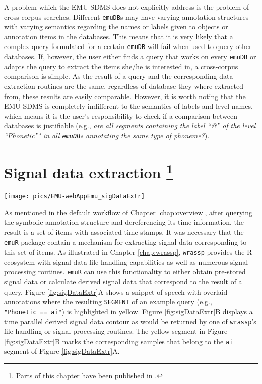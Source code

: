 \documentclass[
]{book}
\begin{document}
A problem which the EMU-SDMS does not explicitly address is the problem of cross-corpus searches. Different \texttt{emuDB}s may have varying annotation structures with varying semantics regarding the names or labels given to objects or annotation items in the databases. This means that it is very likely that a complex query formulated for a certain \texttt{emuDB} will fail when used to query other databases. If, however, the user either finds a query that works on every \texttt{emuDB} or adapts the query to extract the items she/he is interested in, a cross-corpus comparison is simple. As the result of a query and the corresponding data extraction routines are the same, regardless of database they where extracted from, these results are easily comparable. However, it is worth noting that the EMU-SDMS is completely indifferent to the semantics of labels and level names, which means it is the user's responsibility to check if a comparison between databases is justifiable (e.g., \emph{are all segments containing the label ``@'' of the level ``Phonetic''" in all \texttt{emuDB}s annotating the same type of phoneme?}).

\hypertarget{chap:sigDataExtr}{%
\chapter[Signal data extraction ]{\texorpdfstring{Signal data extraction \footnote{Parts of this chapter have been published in \citet{winkelmann:2017aa}.}}{Signal data extraction }}\label{chap:sigDataExtr}}

\begin{center}\texttt{[image: pics/EMU-webAppEmu\_sigDataExtr]} \end{center}

As mentioned in the default workflow of Chapter \ref{chap:overview}, after querying the symbolic annotation structure and dereferencing its time information, the result is a set of items with associated time stamps. It was necessary that the \texttt{emuR} package contain a mechanism for extracting signal data corresponding to this set of items. As illustrated in Chapter \ref{chap:wrassp}, \texttt{wrassp} provides the R ecosystem with signal data file handling capabilities as well as numerous signal processing routines. \texttt{emuR} can use this functionality to either obtain pre-stored signal data or calculate derived signal data that correspond to the result of a query. Figure \ref{fig:sigDataExtr}A shows a snippet of speech with overlaid annotations where the resulting \texttt{SEGMENT} of an example query (e.g., \texttt{"Phonetic\ ==\ ai"}) is highlighted in yellow. Figure \ref{fig:sigDataExtr}B displays a time parallel derived signal data contour as would be returned by one of \texttt{wrassp}'s file handling or signal processing routines. The yellow segment in Figure \ref{fig:sigDataExtr}B marks the corresponding samples that belong to the \texttt{ai} segment of Figure \ref{fig:sigDataExtr}A.
\end{document}
